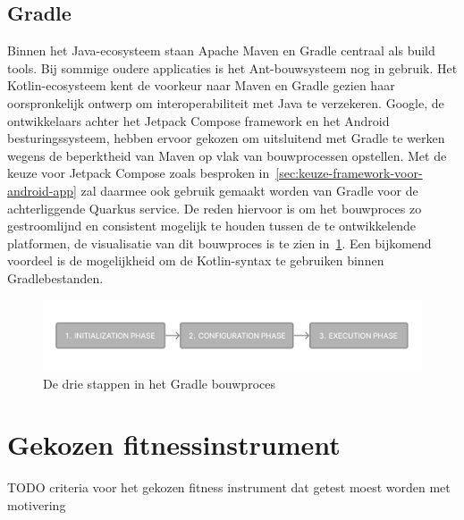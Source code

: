 \subsection{Gradle}
\label{subsec:gradle}
Binnen het Java-ecosysteem staan Apache Maven en Gradle centraal als build tools.
Bij sommige oudere applicaties is het Ant-bouwsysteem nog in gebruik.
Het Kotlin-ecosysteem kent de voorkeur naar Maven en Gradle gezien haar oorspronkelijk ontwerp om interoperabiliteit met Java te verzekeren.
Google, de ontwikkelaars achter het Jetpack Compose framework en het Android besturingssysteem, hebben ervoor gekozen om uitsluitend met Gradle te werken wegens de beperktheid van Maven op vlak van bouwprocessen opstellen.
Met de keuze voor Jetpack Compose zoals besproken in~\ref{sec:keuze-framework-voor-android-app} zal daarmee ook gebruik gemaakt worden van Gradle voor de achterliggende Quarkus service.
De reden hiervoor is om het bouwproces zo gestroomlijnd en consistent mogelijk te houden tussen de te ontwikkelende platformen, de visualisatie van dit bouwproces is te zien in~\ref{fig:visualisatie-gradle-bouwproces}.
Een bijkomend voordeel is de mogelijkheid om de Kotlin-syntax te gebruiken binnen Gradlebestanden.
\begin{figure}
    \includegraphics[width=1\linewidth]{images/gradle-buildprocess}
    \caption{De drie stappen in het Gradle bouwproces~\autocite{Gradle}}
    \label{fig:visualisatie-gradle-bouwproces}
\end{figure}

\section{Gekozen fitnessinstrument}
\label{sec:gekozen-fitnessinstrument}
TODO criteria voor het gekozen fitness instrument dat getest moest worden met motivering